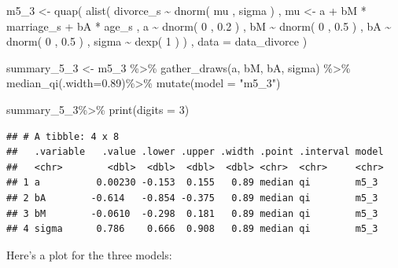 \documentclass[
]{book}
\newenvironment{Shaded}{\begin{snugshade}}{\end{snugshade}}
\newcommand{\AttributeTok}[1]{\textcolor[rgb]{0.77,0.63,0.00}{#1}}
\newcommand{\DecValTok}[1]{\textcolor[rgb]{0.00,0.00,0.81}{#1}}
\newcommand{\FloatTok}[1]{\textcolor[rgb]{0.00,0.00,0.81}{#1}}
\newcommand{\FunctionTok}[1]{\textcolor[rgb]{0.00,0.00,0.00}{#1}}
\newcommand{\NormalTok}[1]{#1}
\newcommand{\OtherTok}[1]{\textcolor[rgb]{0.56,0.35,0.01}{#1}}
\newcommand{\SpecialCharTok}[1]{\textcolor[rgb]{0.00,0.00,0.00}{#1}}
\newcommand{\StringTok}[1]{\textcolor[rgb]{0.31,0.60,0.02}{#1}}
\begin{document}
\begin{Shaded}
\begin{Highlighting}[]
\NormalTok{m5\_3 }\OtherTok{\textless{}{-}} \FunctionTok{quap}\NormalTok{( }
  \FunctionTok{alist}\NormalTok{( }
\NormalTok{    divorce\_s }\SpecialCharTok{\textasciitilde{}} \FunctionTok{dnorm}\NormalTok{( mu , sigma ) , }
\NormalTok{    mu }\OtherTok{\textless{}{-}}\NormalTok{ a }\SpecialCharTok{+}\NormalTok{ bM }\SpecialCharTok{*}\NormalTok{ marriage\_s }\SpecialCharTok{+}\NormalTok{ bA }\SpecialCharTok{*}\NormalTok{ age\_s , }
\NormalTok{    a }\SpecialCharTok{\textasciitilde{}} \FunctionTok{dnorm}\NormalTok{( }\DecValTok{0}\NormalTok{ , }\FloatTok{0.2}\NormalTok{ ) , }
\NormalTok{    bM }\SpecialCharTok{\textasciitilde{}} \FunctionTok{dnorm}\NormalTok{( }\DecValTok{0}\NormalTok{ , }\FloatTok{0.5}\NormalTok{ ) ,}
\NormalTok{    bA }\SpecialCharTok{\textasciitilde{}} \FunctionTok{dnorm}\NormalTok{( }\DecValTok{0}\NormalTok{ , }\FloatTok{0.5}\NormalTok{ ) , }
\NormalTok{    sigma }\SpecialCharTok{\textasciitilde{}} \FunctionTok{dexp}\NormalTok{( }\DecValTok{1}\NormalTok{ )}
\NormalTok{) , }\AttributeTok{data =}\NormalTok{ data\_divorce )}

\NormalTok{summary\_5\_3 }\OtherTok{\textless{}{-}}\NormalTok{ m5\_3 }\SpecialCharTok{\%\textgreater{}\%}
  \FunctionTok{gather\_draws}\NormalTok{(a, bM, bA, sigma) }\SpecialCharTok{\%\textgreater{}\%}
  \FunctionTok{median\_qi}\NormalTok{(}\AttributeTok{.width=}\FloatTok{0.89}\NormalTok{)}\SpecialCharTok{\%\textgreater{}\%}
  \FunctionTok{mutate}\NormalTok{(}\AttributeTok{model =} \StringTok{"m5\_3"}\NormalTok{)}

\NormalTok{summary\_5\_3}\SpecialCharTok{\%\textgreater{}\%}
  \FunctionTok{print}\NormalTok{(}\AttributeTok{digits =} \DecValTok{3}\NormalTok{)}
\end{Highlighting}
\end{Shaded}

\begin{verbatim}
## # A tibble: 4 x 8
##   .variable   .value .lower .upper .width .point .interval model
##   <chr>        <dbl>  <dbl>  <dbl>  <dbl> <chr>  <chr>     <chr>
## 1 a          0.00230 -0.153  0.155   0.89 median qi        m5_3 
## 2 bA        -0.614   -0.854 -0.375   0.89 median qi        m5_3 
## 3 bM        -0.0610  -0.298  0.181   0.89 median qi        m5_3 
## 4 sigma      0.786    0.666  0.908   0.89 median qi        m5_3
\end{verbatim}

Here's a plot for the three models:
\end{document}
